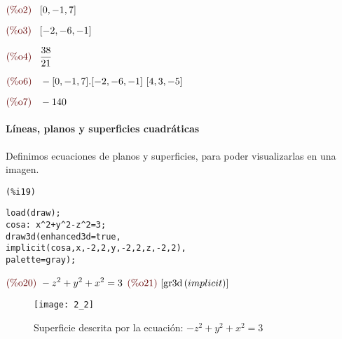 \documentclass[12pt]{article}
\begin{document}
\noindent
\begin{math}\displaystyle
\parbox{8ex}{\color{labelcolor}(\%o2) }
[0,-1,7]
\end{math}

\noindent
\begin{math}\displaystyle
\parbox{8ex}{\color{labelcolor}(\%o3) }
[-2,-6,-1]
\end{math}

\noindent
\begin{math}\displaystyle
\parbox{8ex}{\color{labelcolor}(\%o4) }
\frac{38}{21}
\end{math}

\noindent
\begin{math}\displaystyle
\parbox{8ex}{\color{labelcolor}(\%o6) }
-[0,-1,7] . [-2,-6,-1]~[4,3,-5]
\end{math}

\noindent
\begin{math}\displaystyle
\parbox{8ex}{\color{labelcolor}(\%o7) }
-140
\end{math}

\paragraph{Líneas, planos y superficies cuadráticas} Definimos ecuaciones de planos y superficies, para poder visualizarlas en una imagen.

\noindent
\begin{minipage}[t]{8ex}{\color{red}\bf
\begin{verbatim}
(%i19) 
\end{verbatim}}
\end{minipage}
\begin{minipage}[t]{\textwidth}{\color{blue}
\begin{verbatim}
load(draw);
cosa: x^2+y^2-z^2=3;
draw3d(enhanced3d=true,
implicit(cosa,x,-2,2,y,-2,2,z,-2,2),
palette=gray);
\end{verbatim}}
\end{minipage}
\begin{math}\displaystyle
\parbox{8ex}{\color{labelcolor}(\%o20) }
-{z}^{2}+{y}^{2}+{x}^{2}=3
\end{math}
\begin{math}\displaystyle
\parbox{8ex}{\color{labelcolor}(\%o21) }
[\mathrm{gr3d}\left( implicit\right) ]
\end{math}

\begin{figure}[H]
\centering
\texttt{[image: 2\_2]}
\caption{Superficie descrita por la ecuación: $-{z}^{2}+{y}^{2}+{x}^{2}=3$}
\end{figure}
\end{document}
